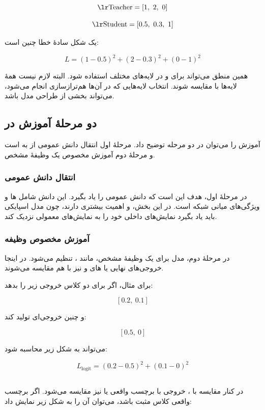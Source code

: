 \[
\text{\eng{Teacher}} = [1,\ 2,\ 0]
\]

\[
\text{\eng{Student}} = [0.5,\ 0.3,\ 1]
\]

یک شکل سادهٔ خطا چنین است:

\[
L = (1 - 0.5)^2 + (2 - 0.3)^2 + (0 - 1)^2
\]

همین منطق می‌تواند برای  و  در لایه‌های مختلف استفاده شود. البته لازم نیست همهٔ لایه‌ها با  مقایسه شوند. انتخاب لایه‌هایی که در آن‌ها هم‌ترازسازی انجام می‌شود، می‌تواند بخشی از طراحی مدل باشد.

\subsection{دو مرحلهٔ آموزش در }
آموزش  را می‌توان در دو مرحله توضیح داد. مرحلهٔ اول انتقال دانش عمومی از  به  است و مرحلهٔ دوم آموزش مخصوص یک وظیفهٔ مشخص.

\subsubsection{انتقال دانش عمومی}
در مرحلهٔ اول، هدف این است که  دانش عمومی  را یاد بگیرد. این دانش شامل ها و ویژگی‌های میانی شبکه است. در این بخش،  و  اهمیت بیشتری دارند، چون مدل اسپایکی باید یاد بگیرد نمایش‌های داخلی خود را به نمایش‌های  معمولی نزدیک کند.

\subsubsection{آموزش مخصوص وظیفه}
در مرحلهٔ دوم، مدل برای یک وظیفهٔ مشخص، مانند ، تنظیم می‌شود. در اینجا خروجی‌های نهایی یا های  و  نیز با هم مقایسه می‌شوند.

برای مثال، اگر  برای دو کلاس خروجی زیر را بدهد:

\[
[0.2,\ 0.1]
\]

و  چنین خروجی‌ای تولید کند:

\[
[0.5,\ 0]
\]

 می‌تواند به شکل زیر محاسبه شود:

\[
L_{\text{logit}} = (0.2 - 0.5)^2 + (0.1 - 0)^2
\]

\subsection{}
در کنار مقایسه با ، خروجی  با برچسب واقعی یا  نیز مقایسه می‌شود. اگر برچسب واقعی کلاس مثبت باشد، می‌توان آن را به شکل زیر نمایش داد:

